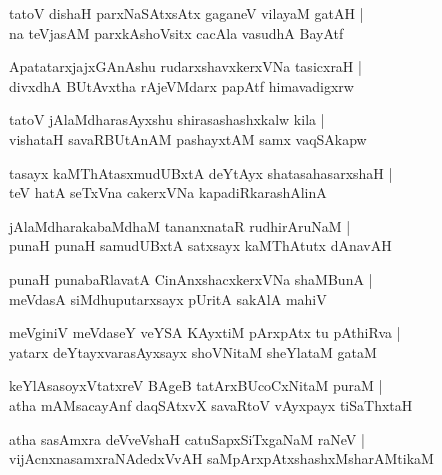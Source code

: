 \documentclass[twoside,12pt,openright]{book}
\newcounter{shloka}[chapter]
\begin{document}
\begin{shloka}%
tatoV dishaH parxNaSAtxsAtx gaganeV vilayaM gatAH |\\
na teVjasAM parxkAshoVsitx cacAla vasudhA BayAtf 
\end{shloka}

\begin{shloka}%
ApatatarxjajxGAnAshu rudarxshavxkerxVNa tasicxraH |\\
divxdhA BUtAvxtha rAjeVMdarx papAtf himavadigxrw
\end{shloka}

\begin{shloka}%
tatoV jAlaMdharasAyxshu shirasashashxkalw kila |\\
vishataH savaRBUtAnAM pashayxtAM samx vaqSAkapw 
\end{shloka}

\begin{shloka}%
tasayx kaMThAtasxmudUBxtA deYtAyx shatasahasarxshaH |\\
teV hatA seTxVna cakerxVNa kapadiRkarashAlinA 
\end{shloka}

\begin{shloka}%
jAlaMdharakabaMdhaM tananxnataR rudhirAruNaM |\\
punaH punaH samudUBxtA satxsayx kaMThAtutx dAnavAH 
\end{shloka}

\begin{shloka}%
punaH punabaRlavatA CinAnxshacxkerxVNa shaMBunA |\\
meVdasA siMdhuputarxsayx pUritA sakAlA mahiV 
\end{shloka}

\begin{shloka}%
meVginiV meVdaseY veYSA KAyxtiM pArxpAtx tu pAthiRva |\\
yatarx deYtayxvarasAyxsayx shoVNitaM sheYlataM gataM
\end{shloka}

\begin{shloka}%
keYlAsasoyxVtatxreV BAgeB tatArxBUcoCxNitaM puraM |\\
atha mAMsacayAnf daqSAtxvX savaRtoV vAyxpayx tiSaThxtaH
\end{shloka}

\begin{shloka}%
atha sasAmxra deVveVshaH catuSapxSiTxgaNaM raNeV |\\
vijAcnxnasamxraNAdedxVvAH saMpArxpAtxshashxMsharAMtikaM 
\end{shloka}
\end{document}
